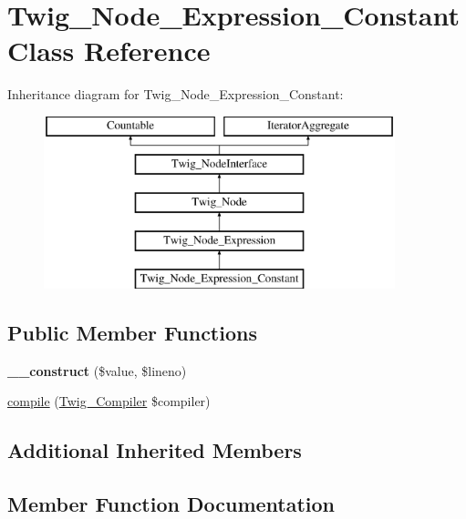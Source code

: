 \hypertarget{class_twig___node___expression___constant}{}\section{Twig\+\_\+\+Node\+\_\+\+Expression\+\_\+\+Constant Class Reference}
\label{class_twig___node___expression___constant}
Inheritance diagram for Twig\+\_\+\+Node\+\_\+\+Expression\+\_\+\+Constant\+:\begin{figure}[H]
\begin{center}
\leavevmode
\includegraphics[height=5.000000cm]{class_twig___node___expression___constant}
\end{center}
\end{figure}
\subsection*{Public Member Functions}
\begin{DoxyCompactItemize}
\item 
\hypertarget{class_twig___node___expression___constant_a1f2b473cb4decd31a8d554e2356f39b4}{}{\bfseries \+\_\+\+\_\+construct} (\$value, \$lineno)\label{class_twig___node___expression___constant_a1f2b473cb4decd31a8d554e2356f39b4}

\item 
\hyperlink{class_twig___node___expression___constant_a4e0faa87c3fae583620b84d3607085da}{compile} (\hyperlink{class_twig___compiler}{Twig\+\_\+\+Compiler} \$compiler)
\end{DoxyCompactItemize}
\subsection*{Additional Inherited Members}


\subsection{Member Function Documentation}
\hypertarget{class_twig___node___expression___constant_a4e0faa87c3fae583620b84d3607085da}{}
